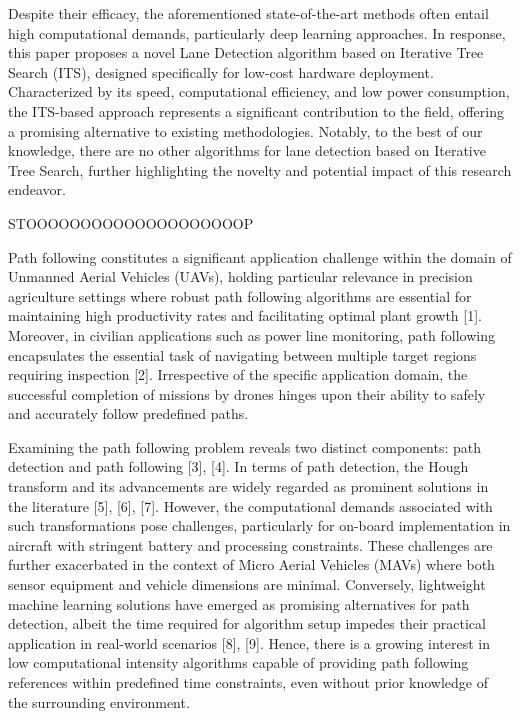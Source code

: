 Despite their efficacy, the aforementioned state-of-the-art methods often entail high computational demands, particularly deep learning approaches. In response, this paper proposes a novel Lane Detection algorithm based on Iterative Tree Search (ITS), designed specifically for low-cost hardware deployment. Characterized by its speed, computational efficiency, and low power consumption, the ITS-based approach represents a significant contribution to the field, offering a promising alternative to existing methodologies. Notably, to the best of our knowledge, there are no other algorithms for lane detection based on Iterative Tree Search, further highlighting the novelty and potential impact of this research endeavor.


STOOOOOOOOOOOOOOOOOOOOP

Path following constitutes a significant application challenge within the domain of Unmanned Aerial Vehicles (UAVs), holding particular relevance in precision agriculture settings where robust path following algorithms are essential for maintaining high productivity rates and facilitating optimal plant growth [1]. Moreover, in civilian applications such as power line monitoring, path following encapsulates the essential task of navigating between multiple target regions requiring inspection [2]. Irrespective of the specific application domain, the successful completion of missions by drones hinges upon their ability to safely and accurately follow predefined paths.

Examining the path following problem reveals two distinct components: path detection and path following [3], [4]. In terms of path detection, the Hough transform and its advancements are widely regarded as prominent solutions in the literature [5], [6], [7]. However, the computational demands associated with such transformations pose challenges, particularly for on-board implementation in aircraft with stringent battery and processing constraints. These challenges are further exacerbated in the context of Micro Aerial Vehicles (MAVs) where both sensor equipment and vehicle dimensions are minimal. Conversely, lightweight machine learning solutions have emerged as promising alternatives for path detection, albeit the time required for algorithm setup impedes their practical application in real-world scenarios [8], [9]. Hence, there is a growing interest in low computational intensity algorithms capable of providing path following references within predefined time constraints, even without prior knowledge of the surrounding environment.

